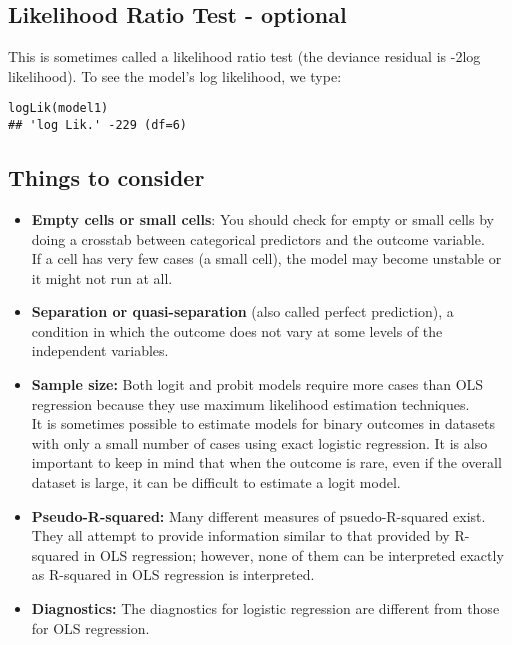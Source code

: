 \documentclass[]{article}
\begin{document}
\subsection{Likelihood Ratio Test - optional}
This is sometimes called a likelihood ratio test (the deviance residual is -2log likelihood). To see the model's log likelihood, we type:
\begin{verbatim}
logLik(model1)
## 'log Lik.' -229 (df=6)
\end{verbatim}
\newpage
\subsection{Things to consider}
\begin{itemize}
\item \textbf{Empty cells or small cells}: You should check for empty or small cells by doing a crosstab between categorical predictors and the outcome variable.\\ If a cell has very few cases (a small cell), the model may become unstable or it might not run at all.
\item \textbf{Separation or quasi-separation} (also called perfect prediction), a condition in which the outcome does not vary at some levels of the independent variables. 
\item 
\textbf{Sample size:} Both logit and probit models require more cases than OLS regression because they use maximum likelihood estimation techniques. \\ It is sometimes possible to estimate models for binary outcomes in datasets with only a small number of cases using exact logistic regression. It is also important to keep in mind that when the outcome is rare, even if the overall dataset is large, it can be difficult to estimate a logit model.
\item \textbf{Pseudo-R-squared:} Many different measures of psuedo-R-squared exist. \\ They all attempt to provide information similar to that provided by R-squared in OLS regression; however, none of them can be interpreted exactly as R-squared in OLS regression is interpreted.
\item \textbf{Diagnostics:} The diagnostics for logistic regression are different from those for OLS regression. 
\end{itemize}
\end{document}

